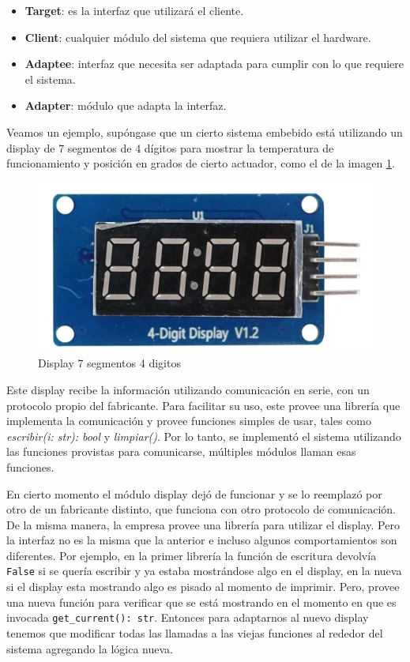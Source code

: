 \begin{itemize}
    \item \textbf{Target}: es la interfaz que utilizará el cliente.
    \item \textbf{Client}: cualquier módulo del sistema que requiera utilizar el hardware.
    \item \textbf{Adaptee}: interfaz que necesita ser adaptada para cumplir con lo que requiere el sistema.
    \item \textbf{Adapter}: módulo que adapta la interfaz.
\end{itemize}

Veamos un ejemplo, supóngase que un cierto sistema embebido está utilizando un display de 7 segmentos de 4 dígitos para mostrar la temperatura de funcionamiento y posición en grados de cierto actuador, como el de la imagen \ref{fig:enter-label}.

\begin{figure}[h]
    \centering
    \includegraphics[width=0.5\linewidth]{display.png}
    \caption{Display 7 segmentos 4 digitos}
    \label{fig:enter-label}
\end{figure}

Este display recibe la información utilizando comunicación en serie, con un protocolo propio del fabricante. Para facilitar su uso, este provee una librería que implementa la comunicación y provee funciones simples de usar, tales como \textit{escribir(i: str): bool} y \textit{limpiar()}. Por lo tanto, se implementó el sistema utilizando las funciones provistas para comunicarse, múltiples módulos llaman esas funciones.

En cierto momento el módulo display dejó de funcionar y se lo reemplazó por otro de un fabricante distinto, que funciona con otro protocolo de comunicación. De la misma manera, la empresa provee una librería para utilizar el display. Pero la interfaz no es la misma que la anterior e incluso algunos comportamientos son diferentes. Por ejemplo, en la primer librería la función de escritura devolvía \verb|False| si se quería escribir y ya estaba mostrándose algo en el display, en la nueva si el display esta mostrando algo es pisado al momento de imprimir. Pero, provee una nueva función para verificar que se está mostrando en el momento en que es invocada \verb|get_current(): str|. Entonces para adaptarnos al nuevo display tenemos que modificar todas las llamadas a las viejas funciones al rededor del sistema agregando la lógica nueva.

